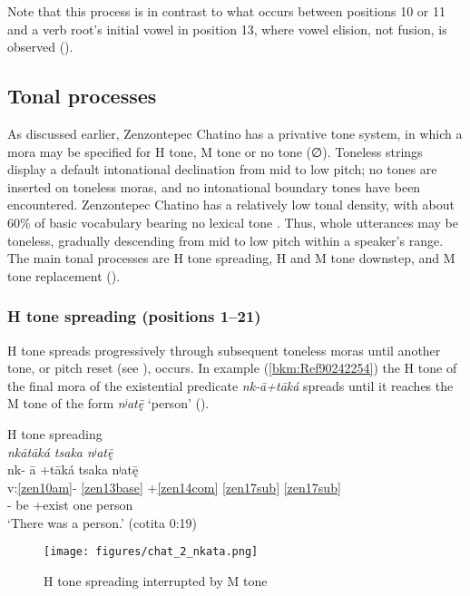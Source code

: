 \documentclass[output=paper]{langscibook}
\begin{document}
Note that this process is in contrast to what occurs between positions 10 or 11 and a verb root's initial vowel in position 13, where vowel elision, not fusion, is observed ().

\subsection{Tonal processes} 
\label{bkm:Ref109738706}
As discussed earlier, Zenzontepec Chatino has a privative tone system, in which a mora may be specified for H tone, M tone or no tone (∅). Toneless strings display a default intonational declination from mid to low pitch; no tones are inserted on toneless moras, and no intonational boundary tones have been encountered. Zenzontepec Chatino has a relatively low tonal density, with about 60\% of basic vocabulary bearing no lexical tone \citep{Campbell2014}. Thus, whole utterances may be toneless, gradually descending from mid to low pitch within a speaker's range. The main tonal processes are H tone spreading, H and M tone downstep, and M tone replacement (\citealt{Campbell2014,Campbell2016}). 

\subsubsection{H tone spreading (positions 1{}--21)}
\label{bkm:Ref112148431}
H tone spreads progressively through subsequent toneless moras until another tone, or pitch reset (see ), occurs. In example (\ref{bkm:Ref90242254}) the H tone of the final mora of the existential predicate \textit{nk-ā+tāká} spreads until it reaches the M tone of the form \textit{nʲatę̄} `person' ().


\ea\label{bkm:Ref90242254}H tone spreading\\
\textit{nkātāká tsaka nʲatę̄} \\ 
\glll nk- ā +tāká tsaka nʲatę̄\\
v:\ref{zen10am}{}- \ref{zen13base} +\ref{zen14com} \ref{zen17sub} \ref{zen17sub} \\ 
\Pfv{}- be +exist one person\\
\glt `There was a person.' (cotita 0:19)
\z

\begin{figure}[p]
    \centering
    \texttt{[image: figures/chat\_2\_nkata.png]}
    \caption{H tone spreading interrupted by M tone}
    \label{fig:chat:key:2}
\end{figure}
\end{document}
